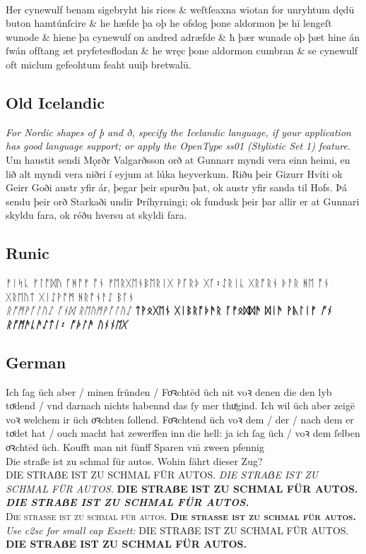 \documentclass[12pt,a4paper,openany]{book}
\newcommand{\saltb}[1]{{\addfontfeatures{Alternate=1}{#1}}}
\begin{document}
\\[1ex]
{
Her cynewulf benam sigebryht his rices \& weſtſeaxna wiotan for
un\-ryht\-um dędū buton hamtúnſcire \& he hæfde þa oþ he ofslog
þone aldormon þe hī lengeſt wunode \& hiene þa cynewulf on
andred adræfde \& ħ þær wunade oþ þæt hine án ſwán ofſtang
æt pryfetesflodan \& he wręc þone aldormon cumbran \& se cynewulf
oft miclum gefeohtum feaht uuiþ bretwalū.}



\subsection*{Old Icelandic}
{\small\itshape For Nordic shapes of þ and ð, specify the Icelandic
language, if your application has good language support; or apply the OpenType
ss01 (Stylistic Set 1) feature.}\\[1ex]
{Um haustit sendi Mǫrðr Valgarðsson orð at Gunnarr myndi vera einn heimi, en
lið alt myndi vera niðri í eyjum at lúka heyverkum. Riðu þeir Gizurr Hvíti ok
Geirr Goði austr yfir ár, þegar þeir spurðu þat, ok austr yfir sanda til Hofs.
Þá sendu þeir orð Starkaði undir Þríhyrningi; ok fundusk þeir þar allir er at
Gunnari skyldu fara, ok réðu hversu at skyldi fara.}

\subsection*{Runic}
ᚠᛁᛋᚳ ᚠᛚᚩᛞᚢ ᚪᚻᚩᚠ ᚩᚾ ᚠᛖᚱᚷᛖᚾᛒᛖᚱᛁᚷ ᚹᚪᚱᚦ ᚷᚪ᛬ᛇᚱᛁᚳ ᚷᚱᚩᚱᚾ ᚦᚨᚱ ᚻᛖ ᚩᚾ ᚷᚱᛖᚢᛏ ᚷᛁᛇᚹᚩᛗ
ᚻᚱᚩᚾᚨᛇ ᛒᚪᚾ\\
\textit{ᚱᚩᛗᚹᚪᛚᚢᛇ ᚪᚾᛞ ᚱᛖᚢᛗᚹᚪᛚᚢᛇ} {\bfseries ᛏᚹᛟᚷᛖᚾ ᚷᛁᛒᚱᚩᚦᚫᚱ ᚪᚠᛟᛞᛞᚫ ᛞᛁᚫ ᚹᚣᛚᛁᚠ \textit{ᚩᚾ ᚱᚩᛗᚫ\linebreak[0]ᚳᚫᛇᛏᛁ᛬
ᚩᚦᛚᚫ ᚢᚾᚾᛖᚷ}}

\subsection*{German}

Ich ſag üch aber / minen fründen / Foͤꝛchtēd üch nit voꝛ denen die den
lyb toͤdend / vnd darnach nichts habennd das ſy mer thuͤgind. Ich wil
üch aber zeigē voꝛ welchem ir üch \saltb{f}oͤꝛchten ſollend. Foͤꝛchtend üch voꝛ
dem / der / nach dem er toͤdet hat / ouch macht hat zewerffen inn die
hell: ja ich ſag üch / voꝛ dem ſelben \saltb{f}oͤꝛchtēd üch. Koufft man nit
fünff Sparen vm̄ zween pfennig\\[1ex]
Die straße ist zu schmal für autos. Wohin fährt dieser Zug?\\
DIE STRAẞE IST ZU SCHMAL FÜR AUTOS.
{\itshape DIE STRAẞE IST ZU SCHMAL FÜR AUTOS.}
{\bfseries DIE STRAẞE IST ZU SCHMAL FÜR AUTOS.}
{\itshape\bfseries DIE STRAẞE IST ZU SCHMAL FÜR AUTOS.}\\[1ex]
{\scshape Die straße ist zu schmal für autos.
\bfseries Die straße ist zu schmal für autos.}
{\itshape Use c2sc for small cap Eszett:}
{DIE STRAẞE IST ZU SCHMAL FÜR AUTOS.
\bfseries DIE STRAẞE IST ZU SCHMAL FÜR AUTOS.}
\end{document}
